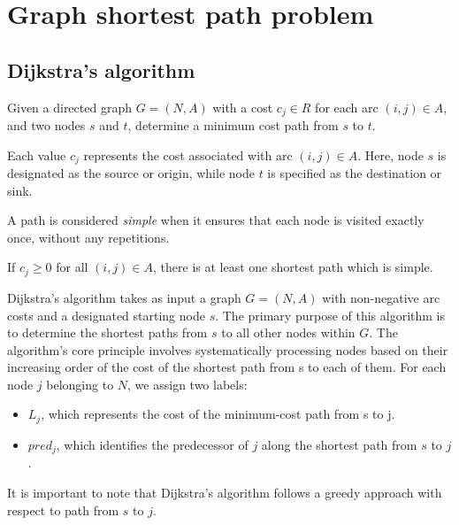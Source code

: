 \section{Graph shortest path problem}

\subsection*{Dijkstra's algorithm}
Given a directed graph $G=(N,A)$ with a cost $c_j \in R$ for each arc $(i,j) \in A$, and two nodes $s$ and $t$, determine a minimum cost path from $s$ to $t$. 

Each value $c_j$ represents the cost associated with arc $(i,j) \in A$. 
Here, node $s$ is designated as the source or origin, while node $t$ is specified as the destination or sink.
\begin{definition}
    A path is considered \emph{simple} when it ensures that each node is visited exactly once, without any repetitions.
\end{definition}
\begin{property}
    If $c_j \geq 0$ for all $(i,j) \in A$, there is at least one shortest path which is simple. 
\end{property}
Dijkstra's algorithm takes as input a graph $G = (N, A)$ with non-negative arc costs and a designated starting node $s$. 
The primary purpose of this algorithm is to determine the shortest paths from $s$ to all other nodes within $G$.
The algorithm's core principle involves systematically processing nodes based on their increasing order of the cost of the shortest path from s to each of them. 
For each node $j$ belonging to $N$, we assign two labels:
\begin{itemize}
    \item $L_j$, which represents the cost of the minimum-cost path from s to j.
    \item $pred_j$, which identifies the predecessor of $j$ along the shortest path from $s$ to $j$.
\end{itemize} 
It is important to note that Dijkstra's algorithm follows a greedy approach with respect to path from $s$ to $j$. 
